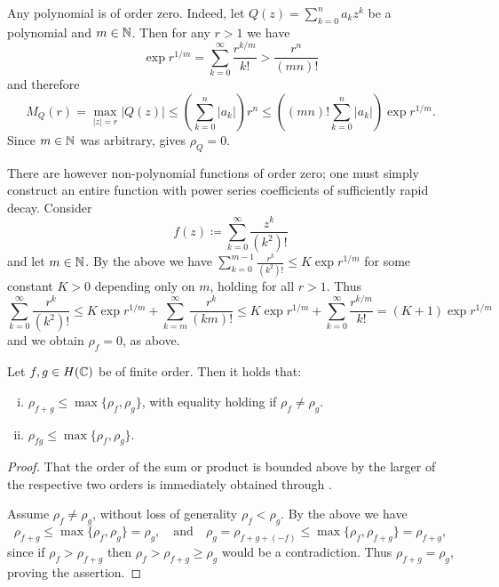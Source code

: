 \begin{remark} \label{rem:order-zero}
    Any polynomial is of order zero. Indeed, let $Q(z) = \sum_{k=0}^n a_k z^k$ be a polynomial and $m \in \mathbb{N}$. Then for any $r > 1$ we have
    $$ \exp r^{1/m} = \sum_{k=0}^\infty \frac{r^{k/m}}{k!} > \frac{r^{n}}{(mn)!} $$
    and therefore
    $$ M_Q(r) = \max_{\vert z \vert = r} \vert Q(z) \vert \leq \left( \sum_{k=0}^n \vert a_k \vert \right) r^n \leq \left( (mn)! \sum_{k=0}^n \vert a_k \vert \right) \exp r^{1/m}. $$
    Since $m \in \mathbb{N}$ was arbitrary,  gives $\rho_Q = 0$.

    There are however non-polynomial functions of order zero; one must simply construct an entire function with power series coefficients of sufficiently rapid decay. Consider
    $$ f(z) \coloneqq \sum_{k=0}^\infty \frac{z^k}{(k^2)!} $$
    and let $m \in \mathbb{N}$. By the above we have $\sum_{k=0}^{m-1} \frac{r^k}{(k^2)!} \leq K \exp r^{1/m}$ for some constant $K > 0$ depending only on $m$, holding for all $r > 1$. Thus
    $$ \sum_{k=0}^\infty \frac{r^k}{(k^2)!} \leq K \exp r^{1/m} + \sum_{k=m}^\infty \frac{r^k}{(km)!} \leq K \exp r^{1/m} + \sum_{k=0}^\infty \frac{r^{k/m}}{k!} = (K + 1) \exp r^{1/m} $$
    and we obtain $\rho_f = 0$, as above.
\end{remark}

\begin{proposition} \label{prop:order-sum-product-estimate}
    Let $f, g \in H(\mathbb{C})$ be of finite order. Then it holds that:
    \begin{enumerate}[i.]
        \item $\rho_{f + g} \leq \max \{ \rho_f, \rho_g \}$, with equality holding if $\rho_f \neq \rho_g$.
        \item $\rho_{fg} \leq \max \{ \rho_f, \rho_g \}$.
    \end{enumerate}
\end{proposition}

\begin{proof}
    That the order of the sum or product is bounded above by the larger of the respective two orders is immediately obtained through .

    Assume $\rho_f \neq \rho_g$, without loss of generality $\rho_f < \rho_g$. By the above we have
    \begin{equation*}
        \rho_{f+g} \leq \max \{ \rho_f, \rho_g \} = \rho_g, \quad\textrm{and}\quad \rho_g = \rho_{f+g+(-f)} \leq \max \{ \rho_f, \rho_{f+g} \} = \rho_{f+g},
    \end{equation*}
    since if $\rho_f > \rho_{f+g}$ then $\rho_f > \rho_{f+g} \geq \rho_g$ would be a contradiction. Thus $\rho_{f+g} = \rho_g$, proving the assertion.
\end{proof}

